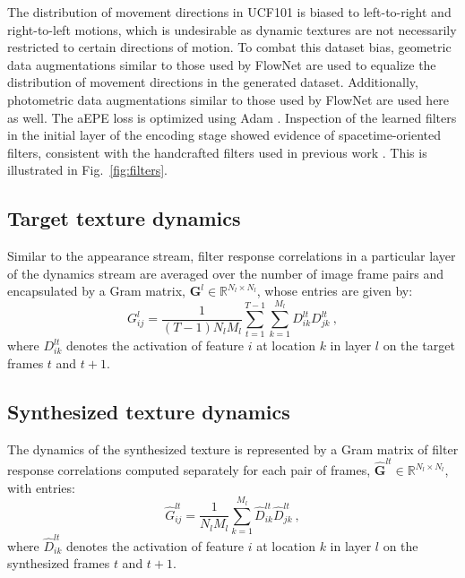The distribution of movement directions in UCF101 is biased to left-to-right and right-to-left motions, which is undesirable as dynamic textures are not necessarily restricted to certain directions of motion. To combat this dataset bias, geometric data augmentations  similar to those used by FlowNet \cite{dosovitskiy2015} are used to equalize the distribution of movement directions in the generated dataset. Additionally, photometric data augmentations  similar to those used by FlowNet \cite{dosovitskiy2015} are used here as well. The aEPE loss is optimized using Adam \cite{kingma2017}.
Inspection of the learned filters in the initial layer of the encoding stage
showed evidence of spacetime-oriented filters, consistent with
the handcrafted filters used in previous work \cite{derpanis2012spacetime}. This is illustrated in Fig.\ \ref{fig:filters}.



\subsection{Target texture dynamics}

Similar to the appearance stream, filter response correlations
in a particular layer of the dynamics
stream are averaged over the number of image frame
pairs and encapsulated by a Gram matrix,
$\mathbf{G}^{l} \in \mathbb{R}^{N_l \times N_l}$,
whose entries are given by:
\begin{equation}
	G_{ij}^l = \frac{1}{(T-1) N_l M_l} \sum_{t=1}^{T-1} \sum_{k=1}^{M_l} D_{ik}^{lt} D_{jk}^{lt}\ ,	
\end{equation}
where $D_{ik}^{lt}$ denotes the activation of feature $i$ at
location $k$ in layer $l$ on the target frames $t$ and $t+1$.

\subsection{Synthesized texture dynamics}

The dynamics of the synthesized texture is represented
by a Gram matrix of filter response correlations 
computed separately for each pair of frames,
$\hat{\mathbf{G}}^{lt} \in \mathbb{R}^{N_l \times N_l}$,
with entries:
\begin{equation}
	\hat{G}_{ij}^{lt} = \frac{1}{N_l M_l} \sum_{k=1}^{M_l} \hat{D}_{ik}^{lt} \hat{D}_{jk}^{lt}\ ,	
\end{equation}
where $\hat{D}_{ik}^{lt}$ denotes the activation of feature $i$ at
location $k$ in layer $l$ on the synthesized frames $t$ and $t+1$.

